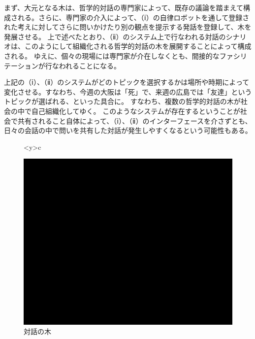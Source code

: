 \documentclass[b5j,twoside,twocolumn]{utarticle}
\begin{document}
まず、大元となる木は、哲学的対話の専門家によって、既存の議論を踏まえて構成される。さらに、専門家の介入によって、（ⅰ）の自律ロボットを通して登録された考えに対してさらに問いかけたり別の観点を提示する発話を登録して、木を発展させる。
上で述べたとおり、（ⅱ）のシステム上で行なわれる対話のシナリオは、このようにして組織化される哲学的対話の木を展開することによって構成される。
ゆえに、個々の現場には専門家が介在しなくとも、間接的なファシリテーションが行なわれることになる。


上記の（ⅰ）、（ⅱ）のシステムがどのトピックを選択するかは場所や時期によって変化させる。すなわち、今週の大阪は「死」で、来週の広島では「友達」というトピックが選ばれる、といった具合に。
すなわち、複数の哲学的対話の木が社会の中で自己組織化してゆく。
このようなシステムが存在するということが社会で共有されること自体によって、（ⅰ）、（ⅱ）のインターフェースを介さずとも、日々の会話の中で問いを共有した対話が発生しやすくなるという可能性もある。
\begin{figure}[h]
\centering
\begin{tabular}<y>{c}
\begin{minipage}[c]{0.65\hsize}
\centering
\includegraphics[scale=0.5]{system3}
\caption{対話の木}
\end{minipage}
\end{tabular}
\end{figure}
\end{document}
